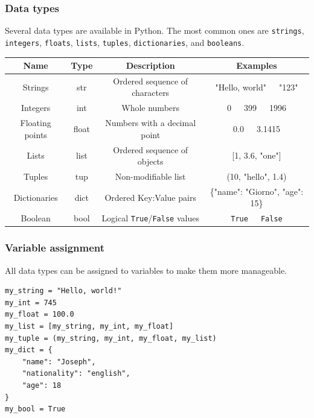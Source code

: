 \documentclass[a4paper,12pt]{article}
\begin{document}
\subsubsection{Data types}

Several data types are available in Python. The most common ones are \verb|strings|, \verb|integers|, \verb|floats|, \verb|lists|, \verb|tuples|, \verb|dictionaries|, and \verb|booleans|.

\vspace{5mm}
\noindent\begin{tabular}{|c|c|c|c|}
    \hline
    {\bfseries Name}&{\bfseries Type}&{\bfseries Description}&{\bfseries Examples}\\
    \hline
    Strings&str&Ordered sequence of characters&"Hello, world"\ \ \ "123"\\
    \hline
    Integers&int&Whole numbers&0\ \ \ 399\ \ \ 1996\\
    \hline
    Floating points&float&Numbers with a decimal point&0.0\ \ \ 3.1415\\
    \hline
    Lists&list&Ordered sequence of objects&[1, 3.6, "one"]\\
    \hline
    Tuples&tup&Non-modifiable list&(10, "hello", 1.4)\\
    \hline
    Dictionaries&dict&Ordered Key:Value pairs&\{"name": "Giorno", "age": 15\}\\
    \hline
    Boolean&bool&Logical \verb|True|/\verb|False| values&\verb|True|\ \ \ \verb|False|\\
    \hline
\end{tabular}

\vspace{5mm}
\subsubsection{Variable assignment}

All data types can be assigned to variables to make them more manageable.

\begin{tcolorbox}[
    enhanced,
    attach boxed title to top left={xshift=6mm,yshift=-3mm},
    colback=lightgreen!20,
    colframe=lightgreen,
    colbacktitle=lightgreen,
    title=Python,
    fonttitle=\bfseries\color{black},
    boxed title style={size=small,colframe=lightgreen,sharp corners},
    sharp corners,
    ]
    \begin{verbatim}
my_string = "Hello, world!"
my_int = 745
my_float = 100.0
my_list = [my_string, my_int, my_float]
my_tuple = (my_string, my_int, my_float, my_list)
my_dict = {
    "name": "Joseph",
    "nationality": "english",
    "age": 18
}
my_bool = True
    \end{verbatim}
\end{tcolorbox}
\end{document}

